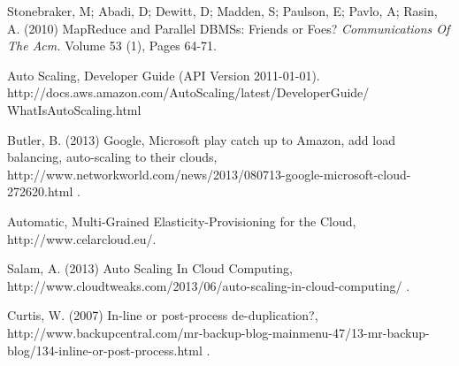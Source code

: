 \documentclass[12pt,a4paper]{article}
\begin{document}
\begin{thebibliography}{99}
 Stonebraker, M; Abadi, D; Dewitt, D; Madden, S; Paulson, E; Pavlo, A; Rasin, A. (2010) MapReduce and Parallel DBMSs: Friends or Foes? 
\emph{Communications Of The Acm.}
Volume 53 (1), Pages 64-71.

 Auto Scaling, Developer Guide (API Version 2011-01-01). http://docs.aws.amazon.com/AutoScaling/latest/DeveloperGuide/
WhatIsAutoScaling.html

 Butler, B. (2013) Google, Microsoft play catch up to Amazon, add load balancing, auto-scaling to their clouds, http://www.networkworld.com/news/2013/080713-google-microsoft-cloud-272620.html .

 Automatic, Multi-Grained Elasticity-Provisioning for the Cloud, http://www.celarcloud.eu/.

 Salam, A. (2013) Auto Scaling In Cloud Computing, http://www.cloudtweaks.com/2013/06/auto-scaling-in-cloud-computing/ .

 Curtis, W. (2007) In-line or post-process de-duplication?, http://www.backupcentral.com/mr-backup-blog-mainmenu-47/13-mr-backup-blog/134-inline-or-post-process.html .



\end{thebibliography}
\end{document}
